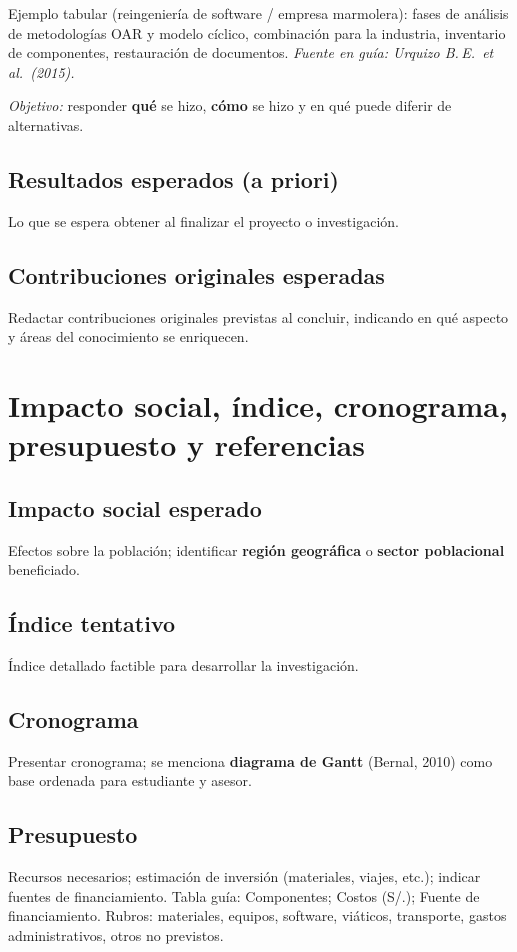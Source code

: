 \documentclass[a4paper,11pt]{book}
\begin{document}
Ejemplo tabular (reingeniería de software / empresa marmolera): fases de análisis de metodologías OAR y modelo cíclico, combinación para la industria, inventario de componentes, restauración de documentos. \textit{Fuente en guía: Urquizo B.\,E.\ et al.\ (2015).}

\textit{Objetivo:} responder \textbf{qué} se hizo, \textbf{cómo} se hizo y en qué puede diferir de alternativas.

\section{Resultados esperados (a priori)}
Lo que se espera obtener al finalizar el proyecto o investigación.

\section{Contribuciones originales esperadas}
Redactar contribuciones originales previstas al concluir, indicando en qué aspecto y áreas del conocimiento se enriquecen.

\chapter{Impacto social, índice, cronograma, presupuesto y referencias}
\label{cap:impacto}

\section{Impacto social esperado}
Efectos sobre la población; identificar \textbf{región geográfica} o \textbf{sector poblacional} beneficiado.

\section{Índice tentativo}
Índice detallado factible para desarrollar la investigación.

\section{Cronograma}
Presentar cronograma; se menciona \textbf{diagrama de Gantt} (Bernal, 2010) como base ordenada para estudiante y asesor.

\section{Presupuesto}
Recursos necesarios; estimación de inversión (materiales, viajes, etc.); indicar fuentes de financiamiento. Tabla guía: Componentes; Costos (S/.); Fuente de financiamiento. Rubros: materiales, equipos, software, viáticos, transporte, gastos administrativos, otros no previstos.
\end{document}
